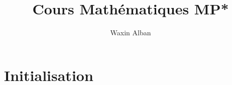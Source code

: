 \documentclass[12pt]{report}
\title{Cours Mathématiques MP*}
\author{Waxin Alban}
\begin{document}
\chapter{Initialisation}
\end{document}
